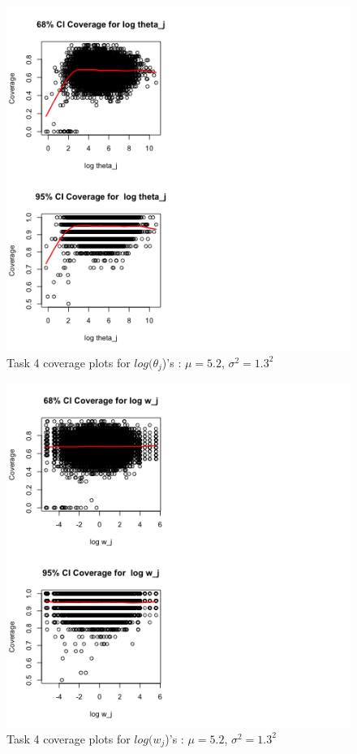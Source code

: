 \documentclass[paper=a4, fontsize=11pt]{scrartcl}
\begin{document}
\begin{figure}[h!]
  \caption{Task 4 coverage plots for $log(\theta_{j}$)'s : $\mu = 5.2$, $\sigma^2 = 1.3^2$}
  \centering
	\includegraphics[scale=1, trim = 0 0 200 0]{keskici_wxiao_ps2_task4_plot5.png}
\end{figure}

\begin{figure}[h!]
  \caption{Task 4 coverage plots for $log(w_{j}$)'s : $\mu = 5.2$, $\sigma^2 = 1.3^2$}
  \centering
	\includegraphics[scale=1, trim = 0 0 200 0]{keskici_wxiao_ps2_task4_plot6.png}
\end{figure}
\end{document}
